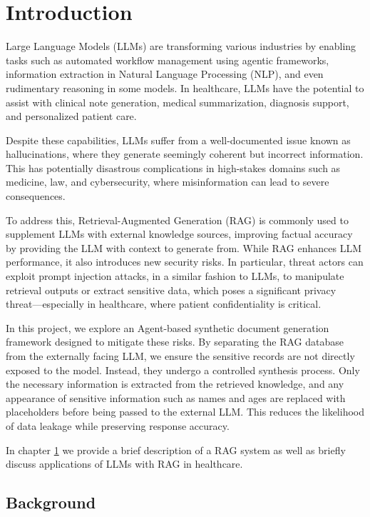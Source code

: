 \chapter{Introduction} \label{introduction}
Large Language Models (LLMs) are transforming various industries by enabling tasks such as automated workflow management using agentic frameworks, information extraction in Natural Language Processing (NLP), and even rudimentary reasoning in some models. In healthcare, LLMs have the potential to assist with clinical note generation, medical summarization, diagnosis support, and personalized patient care.

Despite these capabilities, LLMs suffer from a well-documented issue known as hallucinations, where they generate seemingly coherent but incorrect information. This has potentially disastrous complications in high-stakes domains such as medicine, law, and cybersecurity, where misinformation can lead to severe consequences.

To address this, Retrieval-Augmented Generation (RAG) is commonly used to supplement LLMs with external knowledge sources, improving factual accuracy by providing the LLM with context to generate from. While RAG enhances LLM performance, it also introduces new security risks. In particular, threat actors can exploit prompt injection attacks, in a similar fashion to LLMs, to manipulate retrieval outputs or extract sensitive data, which poses a significant privacy threat—especially in healthcare, where patient confidentiality is critical.

In this project, we explore an Agent-based synthetic document generation framework designed to mitigate these risks. By separating the RAG database from the externally facing LLM, we ensure the sensitive records are not directly exposed to the model. Instead, they undergo a controlled synthesis process. Only the necessary information is extracted from the retrieved knowledge, and any appearance of sensitive information such as names and ages are replaced with placeholders before being passed to the external LLM. This reduces the likelihood of data leakage while preserving response accuracy.

In chapter \ref{introduction} we provide a brief description of a RAG system as well as briefly discuss applications of LLMs with RAG in healthcare.

\section{Background}

